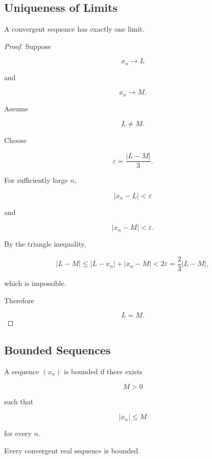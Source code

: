 \subsection{Uniqueness of Limits}
\label{subsec:uniqueness-sequence-limits}

\begin{theorem}
A convergent sequence has exactly one limit.
\end{theorem}

\begin{proof}
Suppose

\[
x_n\to L
\]

and

\[
x_n\to M.
\]

Assume

\[
L\neq M.
\]

Choose

\[
\varepsilon
=
\frac{|L-M|}{3}.
\]

For sufficiently large \(n\),

\[
|x_n-L|<\varepsilon
\]

and

\[
|x_n-M|<\varepsilon.
\]

By the triangle inequality,

\[
|L-M|
\leq
|L-x_n|+|x_n-M|
<
2\varepsilon
=
\frac23|L-M|,
\]

which is impossible.

Therefore

\[
L=M.
\]
\end{proof}

\subsection{Bounded Sequences}
\label{subsec:bounded-sequences}

A sequence \((x_n)\) is bounded if there exists

\[
M>0
\]

such that

\[
\boxed{
|x_n|\leq M
}
\]

for every \(n\).

\begin{theorem}
Every convergent real sequence is bounded.
\end{theorem}

